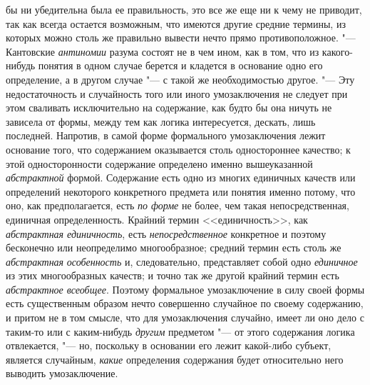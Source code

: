 бы ни убедительна была ее правильность, это все же еще ни к чему не
приводит, так как всегда остается возможным, что имеются другие средние
термины, из которых можно столь же правильно вывести нечто прямо
противоположное. "--- Кантовские
{\em антиномии} разума
состоят не в чем ином, как в том, что из какого-нибудь понятия в одном
случае берется и кладется в основание одно его определение, а в другом
случае "--- с такой же необходимостью другое. "---
Эту недостаточность и случайность того или иного
умозаключения не следует при этом сваливать исключительно на содержание,
как будто бы она ничуть не зависела от формы, между тем как логика
интересуется, дескать, лишь последней. Напротив, в самой форме формального
умозаключения лежит основание того, что содержанием оказывается столь
одностороннее качество; к этой односторонности содержание определено именно
вышеуказанной {\em абстрактной}
формой. Содержание есть одно из многих единичных качеств или
определений некоторого конкретного предмета или понятия именно потому, что
оно, как предполагается, есть {\em по
форме} не более, чем такая непосредственная, единичная
определенность. Крайний термин <<единичность>>, как
{\em абстрактная единичность},
есть
{\em непосредственное}
конкретное и поэтому бесконечно или неопределимо
многообразное; средний термин есть столь же
{\em абстрактная
}{\em особенность} и,
следовательно, представляет собой одно
{\em единичное} из этих
многообразных качеств; и точно так же другой крайний термин есть
{\em абстрактное всеобщее}.
Поэтому формальное умозаключение в силу своей формы есть
существенным образом нечто совершенно случайное по своему содержанию, и
притом не в том смысле, что для умозаключения случайно, имеет ли оно дело с
таким-то или с каким-нибудь
{\em другим} предметом
"--- от этого содержания логика отвлекается, "---
но, поскольку в основании его лежит какой-либо субъект,
является случайным, {\em какие}
определения содержания будет относительно него выводить
умозаключение.

